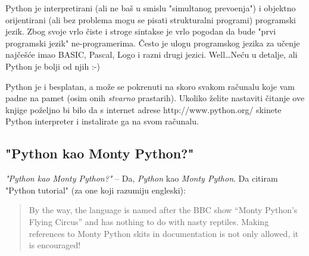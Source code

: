 	Python je interpretirani (ali ne ba\v{s} u smislu "simultanog prevo\dj{}enja") i
	objektno orijentirani (ali bez problema mogu se pisati strukturalni programi)
	programski jezik. Zbog svoje vrlo \v{c}iste i stroge sintakse je vrlo pogodan da
	bude "prvi programski jezik" ne-programerima. \v{C}esto je ulogu programskog jezika
	za u\v{c}enje naj\v{c}e\v{s}\'{c}e imao BASIC, Pascal, Logo i razni drugi jezici. 
	Well\dots Ne\'{c}u u detalje, ali Python je bolji od njih :-)

	Python je i besplatan, a mo\v{z}e se pokrenuti na skoro svakom ra\v{c}unalu koje
	vam padne na pamet (osim onih \emph{stvarno} prastarih). Ukoliko \v{z}elite
	nastaviti \v{c}itanje ove knjige po\v{z}eljno bi bilo da s internet adrese
	http://www.python.org/ skinete Python interpreter i instalirate ga na svom
	ra\v{c}unalu.

\subsection{"Python kao Monty Python?"}

	\emph{"Python kao Monty Python?"} -- Da, \emph{Python} kao \emph{Monty Python}. Da
	citiram "Python tutorial" (za one koji razumiju engleski):

	\begin{quote}
	By the way, the language is named after the BBC show ``Monty Python's
	Flying Circus'' and has nothing to do with nasty reptiles.  Making
	references to Monty Python skits in documentation is not only allowed,
	it is encouraged!
	\end{quote}

